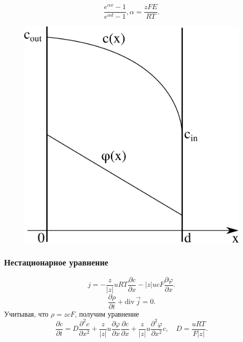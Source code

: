 \documentclass[10pt,pdf]{beamer}
\newcommand{\pder}[2] {\frac{\partial #1}{\partial #2}}
\newcommand{\ppder}[2]{\frac{\partial^2 #1}{\partial {#2}^2}}
\renewcommand{\phi}{\varphi}
\newcommand{\divergence}{\mathrm{div\,}}
\begin{document}
\begin{frame}
\begin{minipage}{.47\textwidth}
\begin{equation}
          \frac{e^{\alpha x} - 1}{e^{\alpha d} - 1},
          \alpha = \frac{zFE}{RT}.
      \end{equation}
      \endgroup
      \begin{figure}[H]
          \center
          \includegraphics[height=.5\textheight]{goldman}
      \end{figure}
    \end{minipage}
  \end{frame}
  \begin{frame}
      \frametitle{Нестационарное уравнение}
        \begin{equation}
          j = -\frac{z}{|z|}uRT\pder{c}{x} - |z|ucF\pder{\phi}{x}.
        \end{equation}
        \begin{equation}
            \pder{\rho}{t} + \divergence\vec{j} = 0.
        \end{equation}
        Учитывая, что \( \rho = zcF \), получим уравнение
        \begin{equation}
            \pder{c}{t} = D\ppder{c}{x} +
            \frac{z}{|z|}u\pder{\phi}{x}\pder{c}{x} +
            \frac{z}{|z|}u\ppder{\phi}{x}c,\quad D = \frac{uRT}{F|z|}.
        \end{equation}
  \end{frame}
\end{document}
